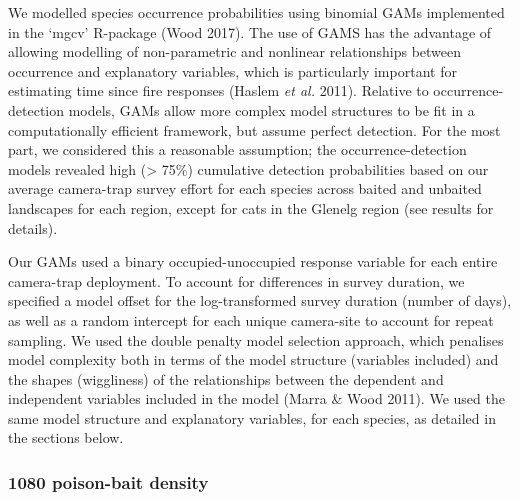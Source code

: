 \documentclass[11pt,a4paper,titlepage,twoside,openright]{style/unimelbthesis}
\begin{document}
\begin{mainmatter}
We modelled species occurrence probabilities using binomial GAMs implemented in the `mgcv' R-package (Wood 2017). The use of GAMS has the advantage of allowing modelling of non-parametric and nonlinear relationships between occurrence and explanatory variables, which is particularly important for estimating time since fire responses (Haslem \emph{et al.} 2011). Relative to occurrence-detection models, GAMs allow more complex model structures to be fit in a computationally efficient framework, but assume perfect detection. For the most part, we considered this a reasonable assumption; the occurrence-detection models revealed high (\textgreater{} 75\%) cumulative detection probabilities based on our average camera-trap survey effort for each species across baited and unbaited landscapes for each region, except for cats in the Glenelg region (see results for details).

Our GAMs used a binary occupied-unoccupied response variable for each entire camera-trap deployment. To account for differences in survey duration, we specified a model offset for the log-transformed survey duration (number of days), as well as a random intercept for each unique camera-site to account for repeat sampling. We used the double penalty model selection approach, which penalises model complexity both in terms of the model structure (variables included) and the shapes (wiggliness) of the relationships between the dependent and independent variables included in the model (Marra \& Wood 2011). We used the same model structure and explanatory variables, for each species, as detailed in the sections below.

\hypertarget{poison-bait-density}{%
\subsubsection{1080 poison-bait density}\label{poison-bait-density}}


\end{mainmatter}
\end{document}
